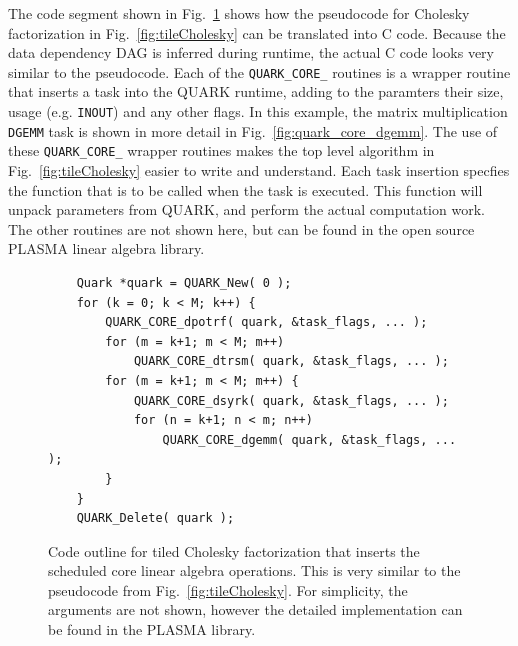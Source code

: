 \documentclass[11pt,letterpaper]{report}
\begin{document}
The code segment shown in Fig.~\ref{fig:tileCholeskyCode} shows how
the pseudocode for Cholesky factorization in
Fig.~\ref{fig:tileCholesky} can be translated into C code.  Because
the data dependency DAG is inferred during runtime, the actual C code
looks very similar to the pseudocode.  Each of the \verb|QUARK_CORE_|
routines is a wrapper routine that inserts a task into the QUARK
runtime, adding to the paramters their size, usage (e.g. \verb|INOUT|)
and any other flags. In this example, the matrix multiplication
\verb|DGEMM| task is shown in more detail in
Fig.~\ref{fig:quark_core_dgemm}.  The use of these \verb|QUARK_CORE_|
wrapper routines makes the top level algorithm in
Fig.~\ref{fig:tileCholesky} easier to write and understand.  Each task
insertion specfies the function that is to be called when the task is
executed.  This function will unpack parameters from QUARK, and
perform the actual computation work.  The other routines are not shown
here, but can be found in the open source PLASMA linear algebra
library.
\begin{figure}[pbt]
\centering
\scriptsize
\begin{lstlisting}
    Quark *quark = QUARK_New( 0 );
    for (k = 0; k < M; k++) {
        QUARK_CORE_dpotrf( quark, &task_flags, ... );
        for (m = k+1; m < M; m++)
            QUARK_CORE_dtrsm( quark, &task_flags, ... );
        for (m = k+1; m < M; m++) {
            QUARK_CORE_dsyrk( quark, &task_flags, ... );
            for (n = k+1; n < m; n++)
                QUARK_CORE_dgemm( quark, &task_flags, ... );
        }
    }
    QUARK_Delete( quark );
\end{lstlisting}
\caption{Code outline for tiled Cholesky factorization that inserts
  the scheduled core linear algebra operations.  This is very similar
  to the pseudocode from Fig.~\ref{fig:tileCholesky}.  For simplicity,
  the arguments are not shown, however the detailed implementation can
  be found in the PLASMA library. }
\label{fig:tileCholeskyCode}
\end{figure}
\end{document}
